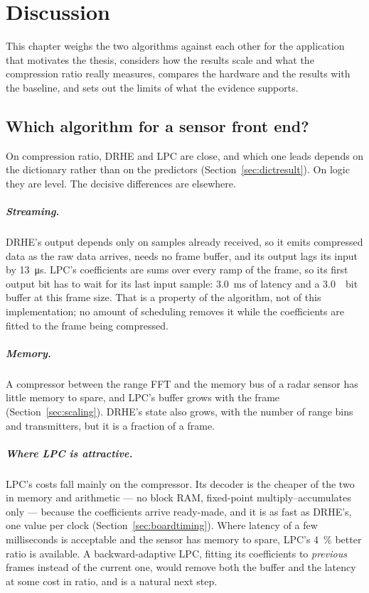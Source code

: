 \chapter{Discussion}
\label{ch:discussion}

This chapter weighs the two algorithms against each other for the application
that motivates the thesis, considers how the results scale and what the
compression ratio really measures, compares the hardware and the results with
the baseline, and sets out the limits of what the evidence supports.

\section{Which algorithm for a sensor front end?}
\label{sec:choice}

On compression ratio, DRHE and LPC are close, and which one leads depends on
the dictionary rather than on the predictors (Section~\ref{sec:dictresult}). On
logic they are level. The decisive differences are elsewhere.

\paragraph{Streaming.} DRHE's output depends only on samples already received,
so it emits compressed data as the raw data arrives, needs no frame buffer, and
its output lags its input by \SI{13}{\micro\second}. LPC's coefficients are sums
over every ramp of the frame, so its first output bit has to wait for its last
input sample: \SI{3.0}{\milli\second} of latency and a \SI{3.0}{\mebi bit}
buffer at this frame size. That is a property of the algorithm, not of this
implementation; no amount of scheduling removes it while the coefficients are
fitted to the frame being compressed.

\paragraph{Memory.} A compressor between the range FFT and the memory bus of a
radar sensor has little memory to spare, and LPC's buffer grows with the frame
(Section~\ref{sec:scaling}). DRHE's state also grows, with the number of range
bins and transmitters, but it is a fraction of a frame.

\paragraph{Where LPC is attractive.} LPC's costs fall mainly on the compressor.
Its decoder is the cheaper of the two in memory and arithmetic --- no block
RAM, fixed-point multiply--accumulates only --- because the coefficients arrive
ready-made, and it is as fast as DRHE's, one value per clock
(Section~\ref{sec:boardtiming}). Where latency of a few milliseconds
is acceptable and the sensor has memory to spare, LPC's \SI{4}{\percent} better
ratio is available. A backward-adaptive LPC, fitting its coefficients to
\emph{previous} frames instead of the current one, would remove both the buffer
and the latency at some cost in ratio, and is a natural next step.

